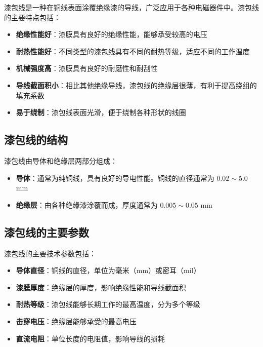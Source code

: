 \documentclass[12pt,UTF8]{ctexbook}
\begin{document}
漆包线是一种在铜线表面涂覆绝缘漆的导线，广泛应用于各种电磁器件中。漆包线的主要特点包括：

\begin{itemize}[leftmargin=3.5em]
    \item \textbf{绝缘性能好}：漆膜具有良好的绝缘性能，能够承受较高的电压
    \item \textbf{耐热性能好}：不同类型的漆包线具有不同的耐热等级，适应不同的工作温度
    \item \textbf{机械强度高}：漆膜具有良好的耐磨性和耐刮性
    \item \textbf{导线截面积小}：相比其他绝缘导线，漆包线的绝缘层很薄，有利于提高绕组的填充系数
    \item \textbf{易于绕制}：漆包线表面光滑，便于绕制各种形状的线圈
\end{itemize}

\subsection{漆包线的结构}

漆包线由导体和绝缘层两部分组成：

\begin{itemize}[leftmargin=3.5em]
    \item \textbf{导体}：通常为纯铜线，具有良好的导电性能。铜线的直径通常为 $0.02 \sim 5.0$ mm
    \item \textbf{绝缘层}：由各种绝缘漆涂覆而成，厚度通常为 $0.005 \sim 0.05$ mm
\end{itemize}

\subsection{漆包线的主要参数}

漆包线的主要技术参数包括：

\begin{itemize}[leftmargin=3.5em]
    \item \textbf{导体直径}：铜线的直径，单位为毫米（mm）或密耳（mil）
    \item \textbf{漆膜厚度}：绝缘层的厚度，影响绝缘性能和导线截面积
    \item \textbf{耐热等级}：漆包线能够长期工作的最高温度，分为多个等级
    \item \textbf{击穿电压}：绝缘层能够承受的最高电压
    \item \textbf{直流电阻}：单位长度的电阻值，影响导线的损耗
\end{itemize}
\end{document}
